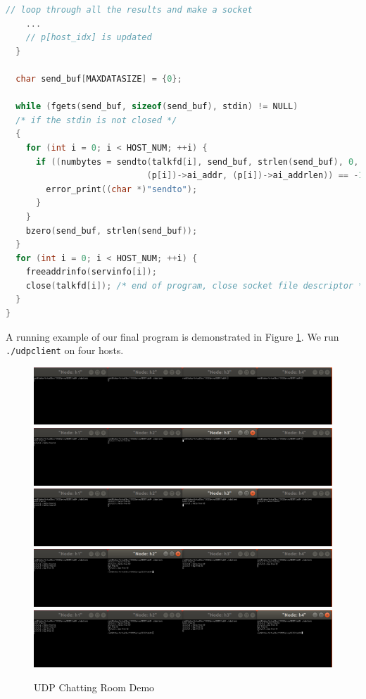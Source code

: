 \begin{exercise}[]
\begin{lstlisting}[language=C]
    // loop through all the results and make a socket
    ...
    // p[host_idx] is updated
  }

  char send_buf[MAXDATASIZE] = {0};

  while (fgets(send_buf, sizeof(send_buf), stdin) != NULL)
  /* if the stdin is not closed */
  {
    for (int i = 0; i < HOST_NUM; ++i) {
      if ((numbytes = sendto(talkfd[i], send_buf, strlen(send_buf), 0,
                            (p[i])->ai_addr, (p[i])->ai_addrlen)) == -1) {
        error_print((char *)"sendto");
      }
    }
    bzero(send_buf, strlen(send_buf));
  }
  for (int i = 0; i < HOST_NUM; ++i) {
    freeaddrinfo(servinfo[i]);
    close(talkfd[i]); /* end of program, close socket file descriptor */
  }
}
\end{lstlisting}


A running example of our final program is demonstrated in Figure \ref{fig:ex2}. We run \texttt{./udpclient} on four hosts.


\begin{figure}[hb]
  \begin{center}
  \includegraphics[width=14cm]{img/lab3/udpchat1.png}
  \includegraphics[width=14cm]{img/lab3/udpchat2.png}
  \includegraphics[width=14cm]{img/lab3/udpchat3.png}
  \includegraphics[width=14cm]{img/lab3/udpchat4.png}
  \includegraphics[width=14cm]{img/lab3/udpchat5.png}
  \caption{UDP Chatting Room Demo}
  \label{fig:ex2}
  \end{center}
\end{figure}

\label{ex2}
\end{exercise}

